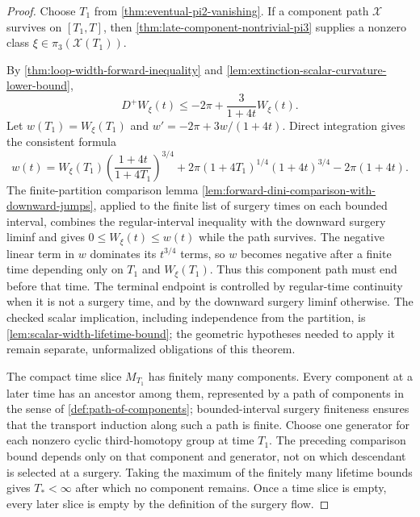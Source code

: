 \begin{proof}
Choose $T_1$ from \ref{thm:eventual-pi2-vanishing}.  If a component path
$\mathcal X$ survives on $[T_1,T]$, then
\ref{thm:late-component-nontrivial-pi3} supplies a nonzero class
$\xi\in\pi_3(\mathcal X(T_1))$.

By \ref{thm:loop-width-forward-inequality} and
\ref{lem:extinction-scalar-curvature-lower-bound},
\[
 D^+W_\xi(t)\le-2\pi+\frac3{1+4t}W_\xi(t).
\]
Let $w(T_1)=W_\xi(T_1)$ and
$w'=-2\pi+3w/(1+4t)$.  Direct integration gives the consistent formula
\[
 w(t)=W_\xi(T_1)
       \left(\frac{1+4t}{1+4T_1}\right)^{3/4}
 +2\pi(1+4T_1)^{1/4}(1+4t)^{3/4}-2\pi(1+4t).
\]
The finite-partition comparison lemma
\ref{lem:forward-dini-comparison-with-downward-jumps}, applied to the finite
list of surgery times on each bounded interval, combines the regular-interval
inequality with the downward surgery liminf and gives
$0\le W_\xi(t)\le w(t)$ while the path survives.  The negative linear
term in $w$ dominates its $t^{3/4}$ terms, so $w$ becomes negative after a
finite time depending only on $T_1$ and $W_\xi(T_1)$.  Thus this component
path must end before that time.
The terminal endpoint is controlled by regular-time continuity when it is
not a surgery time, and by the downward surgery liminf otherwise.
The checked scalar implication, including independence from the partition,
is \ref{lem:scalar-width-lifetime-bound}; the geometric hypotheses needed
to apply it remain separate, unformalized obligations of this theorem.

The compact time slice $M_{T_1}$ has finitely many components.  Every
component at a later time has an ancestor among them, represented by a path of
components in the sense of \ref{def:path-of-components}; bounded-interval
surgery finiteness ensures that the transport induction along such a path is
finite.  Choose one generator for each nonzero cyclic third-homotopy group at
time $T_1$.  The preceding comparison bound depends only on that component and
generator, not on which descendant is selected at a surgery.  Taking the
maximum of the finitely many lifetime bounds gives $T_*<\infty$ after which
no component remains.  Once a time slice is empty, every later slice is empty
by the definition of the surgery flow.
\end{proof}
